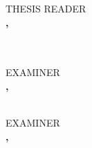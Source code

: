 \documentclass[a4paper, 12pt]{report}
\begin{document}
        \ifexaminer
            \ifexaminertwo
                \vspace{0.75 cm} 
                THESIS READER\\
                \vspace{0.1 cm} 
                    \textbf{\MakeUppercase{\reader}, \readerdegree}\\
                    \small{
                    \readerposition\\
                    \readeruniv}\\

                \vspace{0.75 cm} 
                
                \begin{minipage}[t]{.44\textwidth}\centering
                    EXAMINER\\
                    \vspace{0.1 cm} 
                    \textbf{\MakeUppercase{\examiner}, \examinerdegree}\\
                    \small{
                    \examinerposition\\
                    \examineruniv}
                \end{minipage}\hspace{.02\textwidth}
                \begin{minipage}[t]{.44\textwidth}\centering
                    EXAMINER\\
                    \vspace{0.1 cm} 
                    \textbf{\MakeUppercase{\examiner}, \examinerdegree}\\
                    \small{
                    \examinerposition\\
                    \examineruniv}
                \end{minipage}\\
\end{document}
